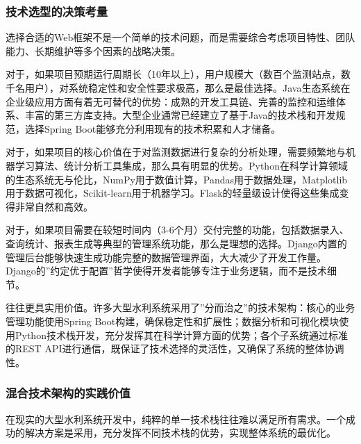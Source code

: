 \hypertarget{ux6280ux672fux9009ux578bux7684ux51b3ux7b56ux8003ux91cf}{%
\subsubsection{技术选型的决策考量}\label{ux6280ux672fux9009ux578bux7684ux51b3ux7b56ux8003ux91cf}}

选择合适的Web框架不是一个简单的技术问题，而是需要综合考虑项目特性、团队能力、长期维护等多个因素的战略决策。

对于，如果项目预期运行周期长（10年以上），用户规模大（数百个监测站点，数千名用户），对系统稳定性和安全性要求极高，那么是最佳选择。Java生态系统在企业级应用方面有着无可替代的优势：成熟的开发工具链、完善的监控和运维体系、丰富的第三方库支持。大型企业通常已经建立了基于Java的技术栈和开发规范，选择Spring Boot能够充分利用现有的技术积累和人才储备。

对于，如果项目的核心价值在于对监测数据进行复杂的分析处理，需要频繁地与机器学习算法、统计分析工具集成，那么具有明显的优势。Python在科学计算领域的生态系统无与伦比，NumPy用于数值计算，Pandas用于数据处理，Matplotlib用于数据可视化，Scikit-learn用于机器学习。Flask的轻量级设计使得这些集成变得非常自然和高效。

对于，如果项目需要在较短时间内（3-6个月）交付完整的功能，包括数据录入、查询统计、报表生成等典型的管理系统功能，那么是理想的选择。Django内置的管理后台能够快速生成功能完整的数据管理界面，大大减少了开发工作量。Django的''约定优于配置''哲学使得开发者能够专注于业务逻辑，而不是技术细节。

往往更具实用价值。许多大型水利系统采用了''分而治之''的技术架构：核心的业务管理功能使用Spring Boot构建，确保稳定性和扩展性；数据分析和可视化模块使用Python技术栈开发，充分发挥其在科学计算方面的优势；各个子系统通过标准的REST API进行通信，既保证了技术选择的灵活性，又确保了系统的整体协调性。

\hypertarget{ux6df7ux5408ux6280ux672fux67b6ux6784ux7684ux5b9eux8df5ux4ef7ux503c}{%
\subsubsection{混合技术架构的实践价值}\label{ux6df7ux5408ux6280ux672fux67b6ux6784ux7684ux5b9eux8df5ux4ef7ux503c}}

在现实的大型水利系统开发中，纯粹的单一技术栈往往难以满足所有需求。一个成功的解决方案是采用，充分发挥不同技术栈的优势，实现整体系统的最优化。

